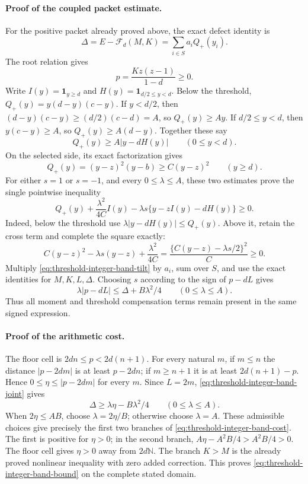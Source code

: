 \paragraph{Proof of the coupled packet estimate.}
For the positive packet already proved above, the exact defect identity is
\[
 \Delta=E-\mathcal F_d(M,K)=\sum_{i\in S}a_iQ_+(y_i).
\]
The root relation gives
\[
 p=\frac{Kz(z-1)}{1-d}\ge0.
\]
Write \(I(y)=\mathbf1_{y\ge d}\) and
\(H(y)=\mathbf1_{d/2\le y<d}\).  Below the threshold,
\(Q_+(y)=y(d-y)(c-y)\).  If \(y<d/2\), then
\((d-y)(c-y)\ge(d/2)(c-d)=A\), so \(Q_+(y)\ge Ay\).
If \(d/2\le y<d\), then \(y(c-y)\ge A\), so
\(Q_+(y)\ge A(d-y)\).  Together these say
\[
 Q_+(y)\ge A|y-dH(y)|\qquad(0\le y<d).
\]
On the selected side, its exact factorization gives
\[
 Q_+(y)=(y-z)^2(y-b)\ge C(y-z)^2\qquad(y\ge d).
\]
For either \(s=1\) or \(s=-1\), and every \(0\le\lambda\le A\),
these two estimates prove the single pointwise inequality
\begin{equation}
 Q_+(y)+\frac{\lambda^2}{4C}I(y)
 -\lambda s\{y-zI(y)-dH(y)\}\ge0.
 \label{eq:threshold-integer-band-tilt}
\end{equation}
Indeed, below the threshold use \(\lambda|y-dH(y)|\le Q_+(y)\).
Above it, retain the cross term and complete the square exactly:
\[
 C(y-z)^2-\lambda s(y-z)+\frac{\lambda^2}{4C}
 =\frac{\{C(y-z)-\lambda s/2\}^2}{C}\ge0.
\]
Multiply \eqref{eq:threshold-integer-band-tilt} by \(a_i\), sum over
\(S\), and use the exact identities for \(M,K,L,\Delta\).  Choosing
\(s\) according to the sign of \(p-dL\) gives
\begin{equation}
 \lambda|p-dL|\le\Delta+B\lambda^2/4
 \qquad(0\le\lambda\le A).
 \label{eq:threshold-integer-band-joint}
\end{equation}
Thus all moment and threshold compensation terms remain present in the
same signed expression.

\paragraph{Proof of the arithmetic cost.}
The floor cell is \(2dn\le p<2d(n+1)\).  For every natural \(m\),
if \(m\le n\) the distance \(|p-2dm|\) is at least \(p-2dn\);
if \(m\ge n+1\) it is at least \(2d(n+1)-p\).  Hence
\(0\le\eta\le|p-2dm|\) for every \(m\).  Since \(L=2m\),
\eqref{eq:threshold-integer-band-joint} gives
\[
 \Delta\ge\lambda\eta-B\lambda^2/4\qquad(0\le\lambda\le A).
\]
When \(2\eta\le AB\), choose \(\lambda=2\eta/B\); otherwise choose
\(\lambda=A\).  These admissible choices give precisely the first two
branches of \eqref{eq:threshold-integer-band-cost}.  The first is positive
for \(\eta>0\); in the second branch,
\(A\eta-A^2B/4>A^2B/4>0\).  The floor cell gives \(\eta>0\) away
from \(2d\mathbb N\).  The branch \(K>M\) is the already proved
nonlinear inequality with zero added correction.  This proves
\eqref{eq:threshold-integer-band-bound} on the complete stated domain.

